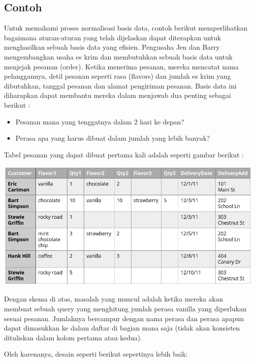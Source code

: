 \documentclass[]{book}
\providecommand{\tightlist}{%
  \setlength{\itemsep}{0pt}\setlength{\parskip}{0pt}}
\begin{document}
\hypertarget{contoh}{%
\subsection{Contoh}\label{contoh}}

Untuk memahami proses normalisasi basis data, contoh berikut memperlihatkan bagaimana aturan-aturan yang telah dijelaskan dapat diterapkan untuk menghasilkan sebuah basis data yang efisien. Pengusaha Jen dan Barry mengembangkan usaha es krim dan membutuhkan sebuah basis data untuk menjejak pesanan (order). Ketika menerima pesanan, mereka mencatat nama pelanggannya, detil pesanan seperti rasa (flavors) dan jumlah es krim yang dibutuhkan, tanggal pesanan dan alamat pengiriman pesanan. Basis data ini diharapkan dapat membantu mereka dalam menjawab dua penting sebagai berikut :

\begin{itemize}
\tightlist
\item
  Pesanan mana yang tenggatnya dalam 2 hari ke depan?
\item
  Perasa apa yang harus dibuat dalam jumlah yang lebih banyak?
\end{itemize}

Tabel pesanan yang dapat dibuat pertama kali adalah seperti gambar berikut :

\includegraphics{./img/tab1_order.png}

Dengan skema di atas, masalah yang muncul adalah ketika mereka akan membuat sebuah query yang menghitung jumlah perasa vanilla yang diperlukan sesuai pesanan. Jumlahnya bercampur dengan nama perasa dan perasa apapun dapat dimasukkan ke dalam daftar di bagian mana saja (tidak akan konsisten dituliskan dalam kolom pertama atau kedua).

Oleh karenanya, desain seperti berikut sepertinya lebih baik:
\end{document}
